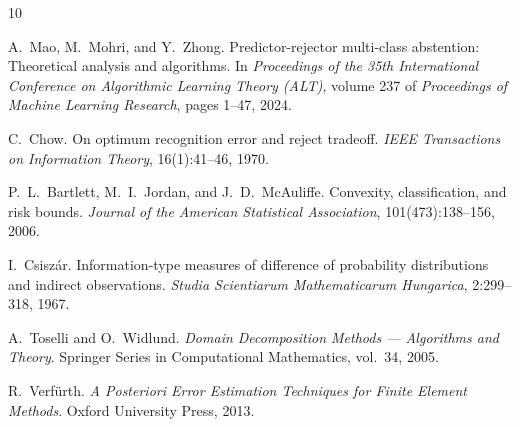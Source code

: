 \documentclass[11pt]{article}
\begin{document}

\begin{thebibliography}{10}

A.~Mao, M.~Mohri, and Y.~Zhong.
\newblock Predictor-rejector multi-class abstention: Theoretical analysis and
  algorithms.
\newblock In \emph{Proceedings of the 35th International Conference on
  Algorithmic Learning Theory (ALT)}, volume 237 of \emph{Proceedings of
  Machine Learning Research}, pages 1--47, 2024.

C.~Chow.
\newblock On optimum recognition error and reject tradeoff.
\newblock \emph{IEEE Transactions on Information Theory}, 16(1):41--46, 1970.

P.~L.~Bartlett, M.~I.~Jordan, and J.~D.~McAuliffe.
\newblock Convexity, classification, and risk bounds.
\newblock \emph{Journal of the American Statistical Association},
  101(473):138--156, 2006.

I.~Csisz{\'a}r.
\newblock Information-type measures of difference of probability distributions
  and indirect observations.
\newblock \emph{Studia Scientiarum Mathematicarum Hungarica}, 2:299--318, 1967.

A.~Toselli and O.~Widlund.
\newblock \emph{Domain Decomposition Methods --- Algorithms and Theory}.
\newblock Springer Series in Computational Mathematics, vol.~34, 2005.

R.~Verf\"urth.
\newblock \emph{A Posteriori Error Estimation Techniques for Finite Element
  Methods}.
\newblock Oxford University Press, 2013.

\end{thebibliography}
\end{document}
